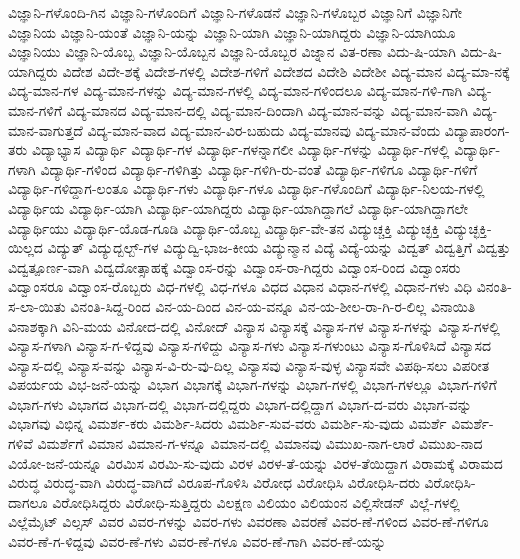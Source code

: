 {ವಿಜ್ಞಾನಿ-ಗಳೊಂದಿ-ಗಿನ
ವಿಜ್ಞಾನಿ-ಗಳೊಂದಿಗೆ
ವಿಜ್ಞಾನಿ-ಗಳೊಡನೆ
ವಿಜ್ಞಾನಿ-ಗಳೊಬ್ಬರ
ವಿಜ್ಞಾನಿಗೆ
ವಿಜ್ಞಾನಿಗೇ
ವಿಜ್ಞಾನಿಯ
ವಿಜ್ಞಾನಿ-ಯಂತೆ
ವಿಜ್ಞಾನಿ-ಯನ್ನು
ವಿಜ್ಞಾನಿ-ಯಾಗಿ
ವಿಜ್ಞಾನಿ-ಯಾಗಿದ್ದರು
ವಿಜ್ಞಾನಿ-ಯಾಗಿಯೂ
ವಿಜ್ಞಾನಿಯು
ವಿಜ್ಞಾನಿ-ಯೊಬ್ಬ
ವಿಜ್ಞಾನಿ-ಯೊಬ್ಬನ
ವಿಜ್ಞಾನಿ-ಯೊಬ್ಬರ
ವಿಜ್ನಾನ
ವಿತ-ರಣಾ
ವಿದು-ಷಿ-ಯಾಗಿ
ವಿದು-ಷಿ-ಯಾಗಿದ್ದರು
ವಿದೇಶ
ವಿದೇ-ಶಕ್ಕೆ
ವಿದೇಶ-ಗಳಲ್ಲಿ
ವಿದೇಶ-ಗಳಿಗೆ
ವಿದೇಶದ
ವಿದೇಶಿ
ವಿದೇಶೀ
ವಿದ್ಯ-ಮಾನ
ವಿದ್ಯ-ಮಾ-ನಕ್ಕೆ
ವಿದ್ಯ-ಮಾನ-ಗಳ
ವಿದ್ಯ-ಮಾನ-ಗಳನ್ನು
ವಿದ್ಯ-ಮಾನ-ಗಳಲ್ಲಿ
ವಿದ್ಯ-ಮಾನ-ಗಳಿಂದಲೂ
ವಿದ್ಯ-ಮಾನ-ಗಳಿ-ಗಾಗಿ
ವಿದ್ಯ-ಮಾನ-ಗಳಿಗೆ
ವಿದ್ಯ-ಮಾನದ
ವಿದ್ಯ-ಮಾನ-ದಲ್ಲಿ
ವಿದ್ಯ-ಮಾನ-ದಿಂದಾಗಿ
ವಿದ್ಯ-ಮಾನ-ವನ್ನು
ವಿದ್ಯ-ಮಾನ-ವಾಗಿ
ವಿದ್ಯ-ಮಾನ-ವಾಗುತ್ತದೆ
ವಿದ್ಯ-ಮಾನ-ವಾದ
ವಿದ್ಯ-ಮಾನ-ವಿರ-ಬಹುದು
ವಿದ್ಯ-ಮಾನವು
ವಿದ್ಯ-ಮಾನ-ವೆಂದು
ವಿದ್ಯಾಪಾರಂಗ-ತರು
ವಿದ್ಯಾಭ್ಯಾಸ
ವಿದ್ಯಾರ್ಥಿ
ವಿದ್ಯಾರ್ಥಿ-ಗಳ
ವಿದ್ಯಾರ್ಥಿ-ಗಳನ್ನಾಗಲೀ
ವಿದ್ಯಾರ್ಥಿ-ಗಳನ್ನು
ವಿದ್ಯಾರ್ಥಿ-ಗಳಲ್ಲಿ
ವಿದ್ಯಾರ್ಥಿ-ಗಳಾಗಿ
ವಿದ್ಯಾರ್ಥಿ-ಗಳಿಂದ
ವಿದ್ಯಾರ್ಥಿ-ಗಳಿಗಿತ್ತು
ವಿದ್ಯಾರ್ಥಿ-ಗಳಿಗಿ-ರು-ವಂತೆ
ವಿದ್ಯಾರ್ಥಿ-ಗಳಿಗೂ
ವಿದ್ಯಾರ್ಥಿ-ಗಳಿಗೆ
ವಿದ್ಯಾರ್ಥಿ-ಗಳಿದ್ದಾಗ-ಲಂತೂ
ವಿದ್ಯಾರ್ಥಿ-ಗಳು
ವಿದ್ಯಾರ್ಥಿ-ಗಳೂ
ವಿದ್ಯಾರ್ಥಿ-ಗಳೊಂದಿಗೆ
ವಿದ್ಯಾರ್ಥಿ-ನಿಲಯ-ಗಳಲ್ಲಿ
ವಿದ್ಯಾರ್ಥಿಯ
ವಿದ್ಯಾರ್ಥಿ-ಯಾಗಿ
ವಿದ್ಯಾರ್ಥಿ-ಯಾಗಿದ್ದರು
ವಿದ್ಯಾರ್ಥಿ-ಯಾಗಿದ್ದಾಗಲೆ
ವಿದ್ಯಾರ್ಥಿ-ಯಾಗಿದ್ದಾಗಲೇ
ವಿದ್ಯಾರ್ಥಿಯು
ವಿದ್ಯಾರ್ಥಿ-ಯೊಡ-ಗೂಡಿ
ವಿದ್ಯಾರ್ಥಿ-ಯೊಬ್ಬ
ವಿದ್ಯಾರ್ಥಿ-ವೇ-ತನ
ವಿದ್ಯುಚ್ಚಕ್ತಿ
ವಿದ್ಯುಚ್ಛಕ್ತಿ
ವಿದ್ಯುಚ್ಛಕ್ತಿ-ಯಿಲ್ಲದ
ವಿದ್ಯುತ್
ವಿದ್ಯುದ್ಬಲ್ಬ್-ಗಳ
ವಿದ್ಯುದ್ವಿ-ಭಾಜ-ಕೀಯ
ವಿದ್ಯುನ್ಮಾನ
ವಿದ್ಯೆ
ವಿದ್ಯೆ-ಯನ್ನು
ವಿದ್ವತ್
ವಿದ್ವತ್ತಿಗೆ
ವಿದ್ವತ್ತು
ವಿದ್ವತ್ಪೂರ್ಣ-ವಾಗಿ
ವಿದ್ವದೋತ್ಸಾಹಕ್ಕೆ
ವಿದ್ವಾಂಸ-ರನ್ನು
ವಿದ್ವಾಂಸ-ರಾ-ಗಿದ್ದರು
ವಿದ್ವಾಂಸ-ರಿಂದ
ವಿದ್ವಾಂಸರು
ವಿದ್ವಾಂಸರೂ
ವಿದ್ವಾಂಸ-ರೊಬ್ಬರು
ವಿಧ-ಗಳಲ್ಲಿ
ವಿಧ-ಗಳೂ
ವಿಧದ
ವಿಧಾನ
ವಿಧಾನ-ಗಳಲ್ಲಿ
ವಿಧಾನ-ಗಳು
ವಿಧಿ
ವಿನಂತಿ-ಸ-ಲಾ-ಯಿತು
ವಿನಂತಿ-ಸಿದ್ದ-ರಿಂದ
ವಿನ-ಯ-ದಿಂದ
ವಿನ-ಯ-ವನ್ನೂ
ವಿನ-ಯ-ಶೀಲ-ರಾ-ಗಿ-ರ-ಲಿಲ್ಲ
ವಿನಾಯಿತಿ
ವಿನಾಶಕ್ಕಾಗಿ
ವಿನಿ-ಮಯ
ವಿನೋದ-ದಲ್ಲಿ
ವಿನೋದ್
ವಿನ್ಯಾಸ
ವಿನ್ಯಾಸಕ್ಕೆ
ವಿನ್ಯಾಸ-ಗಳ
ವಿನ್ಯಾಸ-ಗಳನ್ನು
ವಿನ್ಯಾಸ-ಗಳಲ್ಲಿ
ವಿನ್ಯಾಸ-ಗಳಾಗಿ
ವಿನ್ಯಾಸ-ಗ-ಳಿದ್ದವು
ವಿನ್ಯಾಸ-ಗಳಿದ್ದು
ವಿನ್ಯಾಸ-ಗಳು
ವಿನ್ಯಾಸ-ಗಳುಂಟು
ವಿನ್ಯಾಸ-ಗೊಳಿಸಿದೆ
ವಿನ್ಯಾಸದ
ವಿನ್ಯಾಸ-ದಲ್ಲಿ
ವಿನ್ಯಾಸ-ವನ್ನು
ವಿನ್ಯಾಸ-ವಿ-ರು-ವು-ದಿಲ್ಲ
ವಿನ್ಯಾಸವು
ವಿನ್ಯಾಸ-ವುಳ್ಳ
ವಿನ್ಯಾಸವೇ
ವಿಪಥಿ-ಸಲು
ವಿಪರೀತ
ವಿಪರ್ಯಯ
ವಿಭ-ಜನೆ-ಯನ್ನು
ವಿಭಾಗ
ವಿಭಾಗಕ್ಕೆ
ವಿಭಾಗ-ಗಳನ್ನು
ವಿಭಾಗ-ಗಳಲ್ಲಿ
ವಿಭಾಗ-ಗಳಲ್ಲೂ
ವಿಭಾಗ-ಗಳಿಗೆ
ವಿಭಾಗ-ಗಳು
ವಿಭಾಗದ
ವಿಭಾಗ-ದಲ್ಲಿ
ವಿಭಾಗ-ದಲ್ಲಿದ್ದರು
ವಿಭಾಗ-ದಲ್ಲಿದ್ದಾಗ
ವಿಭಾಗ-ದ-ವರು
ವಿಭಾಗ-ವನ್ನು
ವಿಭಾಗವು
ವಿಭಿನ್ನ
ವಿಮರ್ಶ-ಕರು
ವಿಮರ್ಶಿ-ಸಿದರು
ವಿಮರ್ಶಿ-ಸುವ-ವರು
ವಿಮರ್ಶಿ-ಸು-ವುದು
ವಿಮರ್ಶೆ
ವಿಮರ್ಶೆ-ಗಳಿವೆ
ವಿಮರ್ಶೆಗೆ
ವಿಮಾನ
ವಿಮಾನ-ಗ-ಳನ್ನೂ
ವಿಮಾನ-ದಲ್ಲಿ
ವಿಮಾನವು
ವಿಮುಖ-ನಾಗ-ಲಾರೆ
ವಿಮುಖ-ನಾದ
ವಿಯೋ-ಜನೆ-ಯನ್ನೂ
ವಿರಮಿಸ
ವಿರಮಿ-ಸು-ವುದು
ವಿರಳ
ವಿರಳ-ತೆ-ಯನ್ನು
ವಿರಳ-ತೆಯಿದ್ದಾಗ
ವಿರಾಮಕ್ಕೆ
ವಿರಾಮದ
ವಿರುದ್ಧ
ವಿರುದ್ಧ-ವಾಗಿ
ವಿರುದ್ಧ-ವಾಗಿದೆ
ವಿರೂಪ-ಗೊಳಿಸಿ
ವಿರೋಧ
ವಿರೋಧಿಸಿ
ವಿರೋಧಿಸಿ-ದರು
ವಿರೋಧಿಸಿ-ದಾಗಲೂ
ವಿರೋಧಿಸಿದ್ದರು
ವಿರೋಧಿ-ಸುತ್ತಿದ್ದರು
ವಿಲಕ್ಷಣ
ವಿಲಿಯಂ
ವಿಲಿಯಂನ
ವಿಲ್ಲಿಸೇಡನ್
ವಿಲ್ಲೆ-ಗಳಲ್ಲಿ
ವಿಲ್ಲೆಮೈಟ್
ವಿಲ್ಸಸ್
ವಿವರ
ವಿವರ-ಗಳನ್ನು
ವಿವರ-ಗಳು
ವಿವರಣಾ
ವಿವರಣೆ
ವಿವರ-ಣೆ-ಗಳಿಂದ
ವಿವರ-ಣೆ-ಗಳಿಗೂ
ವಿವರ-ಣೆ-ಗ-ಳಿದ್ದವು
ವಿವರ-ಣೆ-ಗಳು
ವಿವರ-ಣೆ-ಗಳೂ
ವಿವರ-ಣೆ-ಗಾಗಿ
ವಿವರ-ಣೆ-ಯನ್ನು
}
